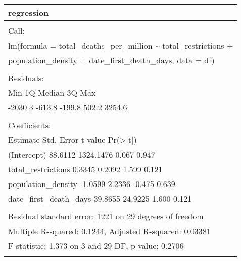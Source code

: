 \documentclass[
]{article}
\begin{document}
\begin{table}
\centering
\begin{tabular}[t]{l}
\hline
regression\\
\hline
\\
\hline
Call:\\
\hline
lm(formula = total\_deaths\_per\_million \textasciitilde{} total\_restrictions +\\
\hline
population\_density + date\_first\_death\_days, data = df)\\
\hline
\\
\hline
Residuals:\\
\hline
Min      1Q  Median      3Q     Max\\
\hline
-2030.3  -613.8  -199.8   502.2  3254.6\\
\hline
\\
\hline
Coefficients:\\
\hline
Estimate Std. Error t value Pr(>|t|)\\
\hline
(Intercept)             88.6112  1324.1476   0.067    0.947\\
\hline
total\_restrictions       0.3345     0.2092   1.599    0.121\\
\hline
population\_density      -1.0599     2.2336  -0.475    0.639\\
\hline
date\_first\_death\_days   39.8655    24.9225   1.600    0.121\\
\hline
\\
\hline
Residual standard error: 1221 on 29 degrees of freedom\\
\hline
Multiple R-squared:  0.1244,    Adjusted R-squared:  0.03381\\
\hline
F-statistic: 1.373 on 3 and 29 DF,  p-value: 0.2706\\
\hline
\\
\hline
\end{tabular}
\end{table}
\end{document}
